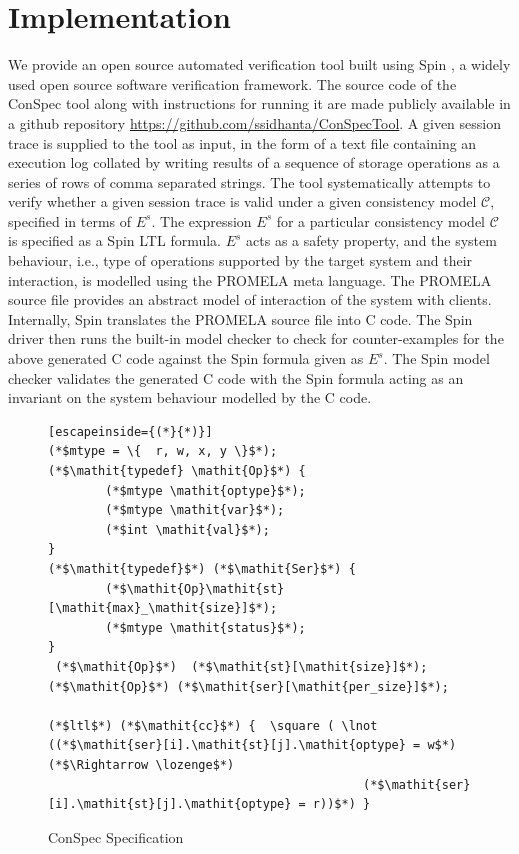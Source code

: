 \documentclass[journal,compsoc]{IEEEtran}
\begin{document}
   \section{Implementation}\label{sec:impl}
 We provide an open source automated verification tool built using Spin \cite{Holzmann:2003:SMC:1405716}, a widely used \cite{spinroot-success} open source software verification framework. The source code of the ConSpec tool along with instructions for running it are made publicly available in a github repository \url{https://github.com/ssidhanta/ConSpecTool}. A given session trace is supplied to the tool as input, in the form of a text file containing an execution log collated by writing results of a sequence of storage operations as a series of rows of comma separated strings. The tool systematically attempts to  verify whether a given session trace is valid under a given consistency model $\mathcal{C}$, specified in terms of  $E^s$.  The expression  $E^s$ for a particular consistency model $\mathcal{C}$ is specified as a Spin LTL formula.  $E^s$ acts as a safety property, and the system behaviour, i.e., type of operations supported by the target system and their interaction, is modelled using the PROMELA meta language. The PROMELA source file provides an abstract model of interaction of the system with clients.   
  Internally, Spin translates the PROMELA source file into C code. The Spin driver then runs the built-in model checker to check for counter-examples for the above generated C code  against  the Spin formula given as $E^s$.  The Spin model checker validates the generated C code with the Spin formula acting as an invariant on the system behaviour modelled by the C code. %
   \begin{figure}\caption{ConSpec Specification}\label{format:spec}
\begin{lstlisting}[escapeinside={(*}{*)}]
(*$mtype = \{  r, w, x, y \}$*);
(*$\mathit{typedef} \mathit{Op}$*) {
		(*$mtype \mathit{optype}$*);
		(*$mtype \mathit{var}$*);
		(*$int \mathit{val}$*);
}
(*$\mathit{typedef}$*) (*$\mathit{Ser}$*) {
		(*$\mathit{Op}\mathit{st}[\mathit{max}_\mathit{size}]$*);
		(*$mtype \mathit{status}$*);
}
 (*$\mathit{Op}$*)  (*$\mathit{st}[\mathit{size}]$*);
(*$\mathit{Op}$*) (*$\mathit{ser}[\mathit{per_size}]$*);

(*$ltl$*) (*$\mathit{cc}$*) {  \square ( \lnot ((*$\mathit{ser}[i].\mathit{st}[j].\mathit{optype} = w$*)  (*$\Rightarrow \lozenge$*) 
											(*$\mathit{ser}[i].\mathit{st}[j].\mathit{optype} = r))$*) }
\end{lstlisting}
\end{figure}
\end{document}
